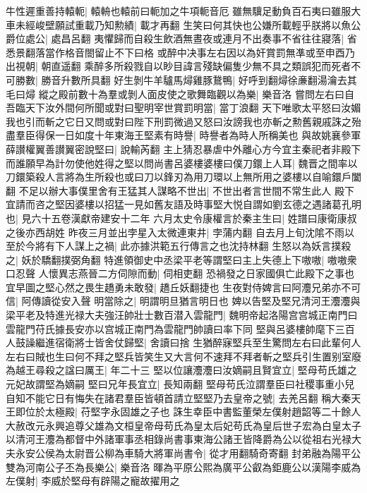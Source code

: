 牛性遲重善持轅軛|{
	轅輈也轅前曰軛加之牛項軛音厄}
雖無驥足動負百石夷曰雖服大車未經峻壁願試重載乃知勲績|{
	載才再翻}
生笑曰何其快也公嫌所載輕乎朕將以魚公爵位處公|{
	處昌呂翻}
夷懼歸而自殺生飲酒無晝夜或連月不出奏事不省往往寢落|{
	省悉景翻落當作格音閤留止不下曰格}
或醉中决事左右因以為奸賞罰無凖或至申酉乃出視朝|{
	朝直遥翻}
乘醉多所殺戮自以眇目諱言殘缺偏隻少無不具之類誤犯而死者不可勝數|{
	勝音升數所具翻}
好生剝牛羊驢馬燖雞豚鵞鴨|{
	好呼到翻燖徐亷翻湯瀹去其毛曰燖}
縱之殿前數十為羣或剝人面皮使之歌舞臨觀以為樂|{
	樂音洛}
嘗問左右曰自吾臨天下汝外間何所聞或對曰聖明宰世賞罰明當|{
	當丁浪翻}
天下唯歌太平怒曰汝媚我也引而斬之它日又問或對曰陛下刑罰微過又怒曰汝謗我也亦斬之勲舊親戚誅之殆盡羣臣得保一日如度十年東海王堅素有時譽|{
	時譽者為時人所稱美也}
與故姚襄參軍薛讃權翼善讃翼密說堅曰|{
	說輸芮翻}
主上猜忍暴虐中外離心方今宜主秦祀者非殿下而誰願早為計勿使他姓得之堅以問尚書呂婆樓婆樓曰僕刀鐶上人耳|{
	魏晋之間率以刀鐶築殺人言將為生所殺也或曰刀以鋒刃為用刀環以上無所用之婆樓以自喻鐶戶闔翻}
不足以辦大事僕里舍有王猛其人謀略不世出|{
	不世出者言世間不常生此人}
殿下宜請而咨之堅因婆樓以招猛一見如舊友語及時事堅大悦自謂如劉玄德之遇諸葛孔明也|{
	見六十五卷漢獻帝建安十二年}
六月太史令康權言於秦主生曰|{
	姓譜曰康衛康叔之後亦西胡姓}
昨夜三月並出孛星入太微連東井|{
	孛蒲内翻}
自去月上旬沈隂不雨以至於今將有下人謀上之禍|{
	此亦據洪範五行傳言之也沈持林翻}
生怒以為妖言撲殺之|{
	妖於驕翻撲弼角翻}
特進領御史中丞梁平老等謂堅曰主上失德上下嗷嗷|{
	嗷嗷衆口忍聲}
人懷異志燕晉二方伺隙而動|{
	伺相吏翻}
恐禍發之日家國俱亡此殿下之事也宜早圖之堅心然之畏生趫勇未敢發|{
	趫丘妖翻捷也}
生夜對侍婢言曰阿灋兄弟亦不可信|{
	阿傳讀從安入聲}
明當除之|{
	明謂明旦猶言明日也}
婢以告堅及堅兄清河王灋灋與梁平老及特進光禄大夫強汪帥壯士數百潜入雲龍門|{
	魏明帝起洛陽宫宫城正南門曰雲龍門苻氏據長安亦以宫城正南門為雲龍門帥讀曰率下同}
堅與呂婆樓帥麾下三百人鼓譟繼進宿衛將士皆舍仗歸堅|{
	舍讀曰捨}
生猶醉寐堅兵至生驚問左右曰此輩何人左右曰賊也生曰何不拜之堅兵皆笑生又大言何不速拜不拜者斬之堅兵引生置别室廢為越王尋殺之諡曰厲王|{
	年二十三}
堅以位讓灋灋曰汝嫡嗣且賢宜立|{
	堅母苟氏雄之元妃故謂堅為嫡嗣}
堅曰兄年長宜立|{
	長知兩翻}
堅母苟氏泣謂羣臣曰社稷事重小兒自知不能它日有悔失在諸君羣臣皆頓首請立堅堅乃去皇帝之號|{
	去羌呂翻}
稱大秦天王即位於太極殿|{
	苻堅字永固雄之子也}
誅生幸臣中書監董榮左僕射趙韶等二十餘人大赦改元永興追尊父雄為文桓皇帝母苟氏為皇太后妃苟氏為皇后世子宏為白皇太子以清河王灋為都督中外諸軍事丞相錄尚書事東海公諸王皆降爵為公以從祖右光禄大夫永安公侯為太尉晋公柳為車騎大將軍尚書令|{
	從才用翻騎奇寄翻}
封弟融為陽平公雙為河南公子丕為長樂公|{
	樂音洛}
暉為平原公熙為廣平公叡為鉅鹿公以漢陽李威為左僕射|{
	李威於堅母有辟陽之寵故擢用之}
